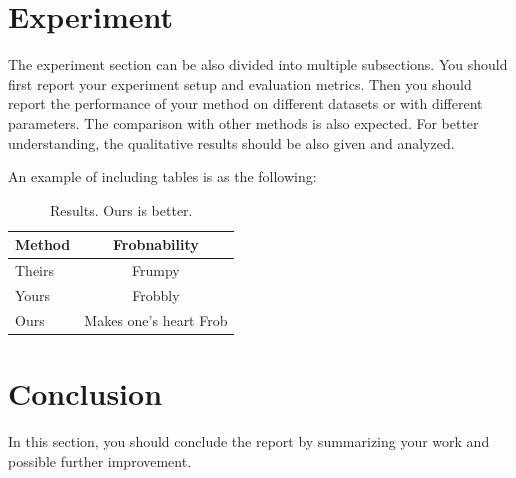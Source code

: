 \documentclass[10pt,twocolumn,letterpaper]{article}
\begin{document}
\section{Experiment}
\label{sec:exp}

The experiment section can be also divided into multiple subsections. You should first report your experiment setup and evaluation metrics. Then you should report the performance of your method on different datasets or with different parameters. The comparison with other methods is also expected. For better understanding, the qualitative results should be also given and analyzed. 


An example of including tables is as the following:

\begin{table}
  \centering
  \begin{tabular}{@{}lc@{}}
    \toprule
    Method & Frobnability \\
    \midrule
    Theirs & Frumpy \\
    Yours & Frobbly \\
    Ours & Makes one's heart Frob\\
    \bottomrule
  \end{tabular}
  \caption{Results.   Ours is better.}
  \label{tab:example}
\end{table}


\section{Conclusion}
\label{sec:conclusion}
In this section, you should conclude the report by summarizing your work and possible further improvement. 

{\small


}
\end{document}
